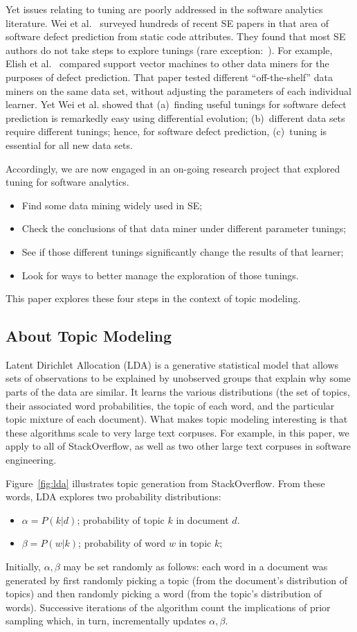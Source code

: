 \documentclass[10pt,conference]{IEEEtran}
\newcommand{\bi}{\begin{itemize}}
\newcommand{\ei}{\end{itemize}}
\theoremstyle{break}
\begin{document}
Yet issues relating to
tuning are poorly addressed in the software analytics literature.  Wei et al.~\cite{fu2016tuning} surveyed hundreds of recent SE papers in that area
of software defect prediction from static code attributes. They found that most SE
  authors do not take steps to explore tunings (rare exception:~\cite{tantithamthavorn2016icse}). For example, Elish et
  al.~\cite{elish2008predicting} compared support vector machines to other data
  miners for the purposes of defect prediction. That paper tested different
  “off-the-shelf” data miners on the same data set, without adjusting the
  parameters of each individual learner.  Yet Wei et al.
  showed that (a)~finding useful tunings for software defect prediction is remarkedly
  easy using differential evolution;  (b)~different data sets require
  different tunings; hence, for software defect prediction,  (c)~tuning is essential for  all
  new data sets.


Accordingly,  we are now engaged in an on-going research project that explored tuning for software analytics.
\bi
\item Find some data mining widely used in SE;
\item Check the conclusions of that data miner under different parameter tunings;
\item See if those different tunings significantly change the results of that learner;
\item Look for ways to better manage the exploration of those tunings.  \ei This
  paper explores these four steps in the context of topic modeling. 


  

\subsection{About Topic Modeling}\label{sect:tm}

Latent Dirichlet Allocation (LDA) is a generative statistical model that allows
sets of observations to be explained by unobserved groups that explain why some
parts of the data are similar. It learns the various distributions (the set of
topics, their associated word probabilities, the topic of each word, and the
particular topic mixture of each document).
What makes topic modeling interesting is that these algorithms scale to very
large text corpuses.  For example, in this paper, we apply to all of StackOverflow,
as well as two other large text corpuses in software engineering.

Figure~\ref{fig:lda} illustrates topic generation from StackOverflow.
From these words, LDA explores two probability distributions:
\bi
\item $\alpha=P(k|d)$; probability of topic $k$ in  document $d$.
\item $\beta=P(w|k)$; probability of word $w$ in topic $k$; 
\ei
  Initially, $\alpha,\beta$ may be set randomly as follows:
each word in a document was generated by first randomly picking a topic (from
the document’s distribution of topics) and then randomly picking a word (from
the topic’s distribution of words). Successive iterations of the algorithm 
count the implications of prior sampling which, in turn,  incrementally updates $\alpha,\beta$.
\end{document}
